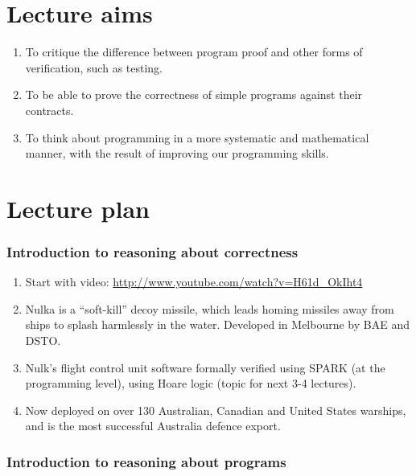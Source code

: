 \documentclass[11pt]{article}
\begin{document}
\section*{Lecture aims}

 \begin{enumerate}

 \item To critique the difference between program proof and other forms of verification, such as testing.

 \item To be able to prove the correctness of simple programs against their contracts.

 \item To think about programming in a more systematic and mathematical manner, with the result of improving our programming skills.

 \end{enumerate}

\section*{Lecture plan}
  
\subsubsection*{Introduction to reasoning about correctness}

\begin{enumerate}

  \item Start with video: \url{http://www.youtube.com/watch?v=H61d_OkIht4}

  \item Nulka is a ``soft-kill'' decoy missile, which leads homing missiles away from ships to splash harmlessly in the water. Developed in Melbourne by BAE and DSTO.

  \item Nulk's flight control unit software formally verified using SPARK (at the programming level), using Hoare logic (topic for next 3-4 lectures).

 \item Now deployed on over 130 Australian, Canadian and United States warships, and is the most successful Australia defence export.

\end{enumerate}

\subsubsection*{Introduction to reasoning about programs}
\end{document}
